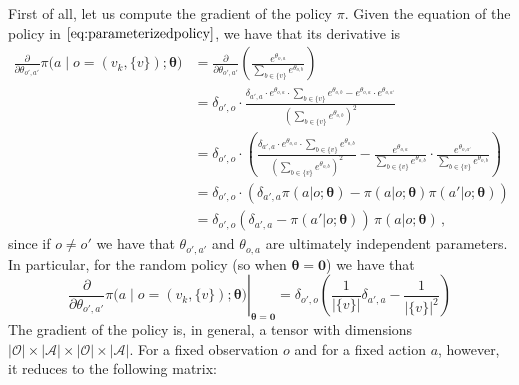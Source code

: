 First of all, let us compute the gradient of the policy $\pi$. Given the equation of the policy in $\eqref{eq:parameterizedpolicy}$, we have that its derivative is
\begin{equation}
    \begin{aligned}
        \frac{\partial}{\partial \theta_{o',a'}} \pi \Big( a \;\big|\; o=(v_k, \{v\}); \boldsymbol \theta \Big)
        &= \frac{\partial}{\partial \theta_{o',a'}} \left( \frac{e^{\theta_{o,a} }}{\sum_{b \in \{v\}} e^{\theta_{o,b} }} \right) \\
        &= \delta_{o',o} \cdot \frac{\delta_{a',a} \cdot e^{\theta_{o,a} } \cdot \sum_{b \in \{v\}} e^{\theta_{o,b} } -  e^{\theta_{o,a} } \cdot e^{\theta_{o, a'} }}{(\sum_{b \in \{v\}} e^{\theta_{o,b}})^2} \\
        &= \delta_{o',o} \cdot \left( \frac{\delta_{a',a} \cdot e^{\theta_{o,a} } \cdot \sum_{b \in \{v\}} e^{\theta_{o,b} }}{(\sum_{b \in \{v\}} e^{\theta_{o,b} })^2} - \frac{e^{\theta_{o,a} }}{\sum_{b \in \{v\}} e^{\theta_{o,b} }}\cdot\frac{e^{\theta_{o,a'} }}{\sum_{b \in \{v\}} e^{\theta_{o,b} }} \right) \\
        &= \delta_{o',o} \cdot \left( \delta_{a',a} \pi(a|o; \boldsymbol \theta) - \pi(a|o; \boldsymbol \theta) \pi(a'|o; \boldsymbol \theta) \right) \\
        &= \delta_{o',o} \left( \delta_{a',a} - \pi(a'|o; \boldsymbol \theta) \right) \, \pi(a|o; \boldsymbol \theta)  \, ,
    \end{aligned}
    \label{eq:gradpi}
\end{equation}
since if $o \neq o'$ we have that $\theta_{o',a'}$ and $\theta_{o,a}$ are ultimately independent parameters. In particular, for the random policy (so when $\boldsymbol \theta = \mathbf 0$) we have that
\begin{equation}
    \left. \frac{\partial}{\partial \theta_{o',a'}} \pi \Big( a \;\big|\; o=(v_k, \{v\}); \boldsymbol \theta \Big) \right|_{\boldsymbol \theta = \mathbf 0}
    = \delta_{o',o} \left(\frac1{|\{v\}|} \delta_{a',a} - \frac1{|\{v\}|^2} \right)
    \label{eq:deriv-pi}
\end{equation}
The gradient of the policy is, in general, a tensor with dimensions $|\mathcal O| \times |\mathcal A| \times |\mathcal O| \times |\mathcal A|$. For a fixed observation $o$ and for a fixed action $a$, however, it reduces to the following matrix:
